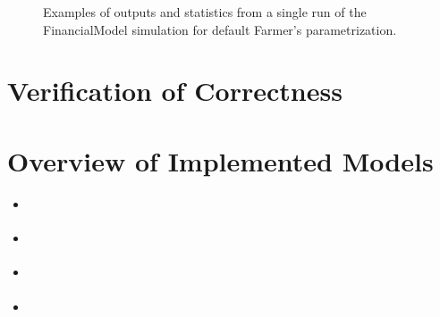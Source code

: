 \documentclass[runningheads]{llncs}
\begin{document}
\begin{figure}[htbp]
\begin{center}
{      
      }
    \caption{Examples of outputs and statistics from a single run of the FinancialModel simulation for default Farmer's parametrization.}
    \label{fig:sampleDynamics}
  \end{center}
\end{figure}


\section{Verification of Correctness}

\section{Overview of Implemented Models}

\begin{itemize}
	\item \cite{farmer2003}
	\item \cite{lamba2007}
	\item \cite{westerhoff2004}
	\item \cite{cont2006}
\end{itemize}



\end{document}
